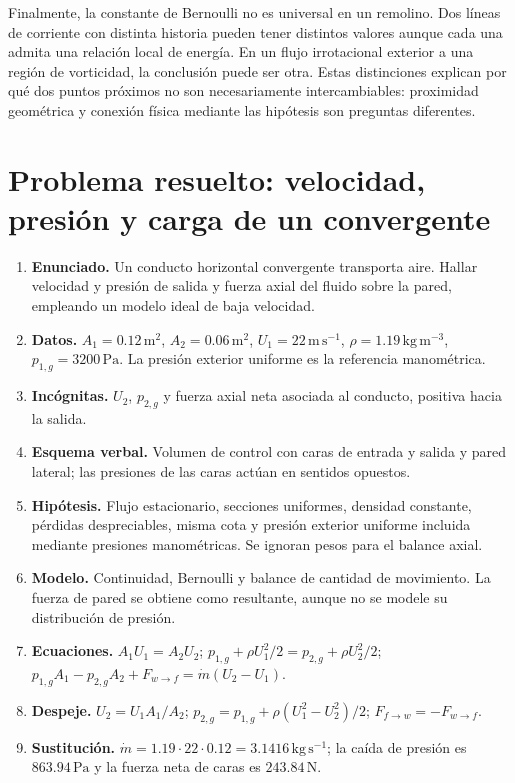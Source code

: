 Finalmente, la constante de Bernoulli no es universal en un remolino. Dos líneas de corriente con distinta historia pueden tener distintos valores aunque cada una admita una relación local de energía. En un flujo irrotacional exterior a una región de vorticidad, la conclusión puede ser otra. Estas distinciones explican por qué dos puntos próximos no son necesariamente intercambiables: proximidad geométrica y conexión física mediante las hipótesis son preguntas diferentes.

\section{Problema resuelto: velocidad, presión y carga de un convergente}
\begin{enumerate}
\item \textbf{Enunciado.} Un conducto horizontal convergente transporta aire. Hallar velocidad y presión de salida y fuerza axial del fluido sobre la pared, empleando un modelo ideal de baja velocidad.
\item \textbf{Datos.} $A_1=0.12\,\mathrm{m^2}$, $A_2=0.06\,\mathrm{m^2}$, $U_1=22\,\mathrm{m\,s^{-1}}$, $\rho=1.19\,\mathrm{kg\,m^{-3}}$, $p_{1,g}=3200\,\mathrm{Pa}$. La presión exterior uniforme es la referencia manométrica.
\item \textbf{Incógnitas.} $U_2$, $p_{2,g}$ y fuerza axial neta asociada al conducto, positiva hacia la salida.
\item \textbf{Esquema verbal.} Volumen de control con caras de entrada y salida y pared lateral; las presiones de las caras actúan en sentidos opuestos.
\item \textbf{Hipótesis.} Flujo estacionario, secciones uniformes, densidad constante, pérdidas despreciables, misma cota y presión exterior uniforme incluida mediante presiones manométricas. Se ignoran pesos para el balance axial.
\item \textbf{Modelo.} Continuidad, Bernoulli y balance de cantidad de movimiento. La fuerza de pared se obtiene como resultante, aunque no se modele su distribución de presión.
\item \textbf{Ecuaciones.} $A_1U_1=A_2U_2$; $p_{1,g}+\rho U_1^2/2=p_{2,g}+\rho U_2^2/2$; $p_{1,g}A_1-p_{2,g}A_2+F_{w\to f}=\dot m(U_2-U_1)$.
\item \textbf{Despeje.} $U_2=U_1A_1/A_2$; $p_{2,g}=p_{1,g}+\rho(U_1^2-U_2^2)/2$; $F_{f\to w}=-F_{w\to f}$.
\item \textbf{Sustitución.} $\dot m=1.19\cdot22\cdot0.12=3.1416\,\mathrm{kg\,s^{-1}}$; la caída de presión es $863.94\,\mathrm{Pa}$ y la fuerza neta de caras es $243.84\,\mathrm{N}$.

\end{enumerate}
